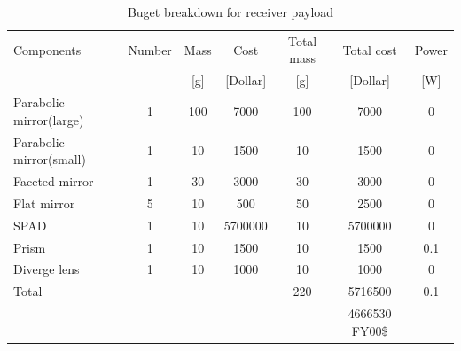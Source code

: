 \begin{table}[ht!]
\begin{tabular}{l | c | c c | c c | c }
Components         & Number & Mass & Cost      & Total mass & Total cost & Power\\ 
                   &        & [g]  & [Dollar]  & [g]        &[Dollar]    & [W]  \\\hline\hline
Parabolic mirror(large)   & 1      & 100  & 7000      & 100        & 7000       &  0   \\
Parabolic mirror(small)   & 1      & 10   & 1500      & 10         & 1500       &  0   \\
Faceted mirror     & 1      & 30   & 3000      & 30         & 3000       &  0   \\ 
Flat mirror        & 5      & 10   & 500       & 50         & 2500       &  0   \\
\acs{SPAD}         & 1      & 10   & 5700000   & 10         & 5700000    &  0   \\
Prism              & 1      & 10   & 1500      & 10         & 1500       &  0.1 \\ 
Diverge lens       & 1      & 10   & 1000      & 10         & 1000       &  0   \\ \hline
Total              &        &      &           & 220        & 5716500    &  0.1 \\
                   &        &      &           &            & 4666530 FY00\$ &
\end{tabular}
\caption{Buget breakdown for receiver payload}
\label{tab:receiverbudget}
\end{table}